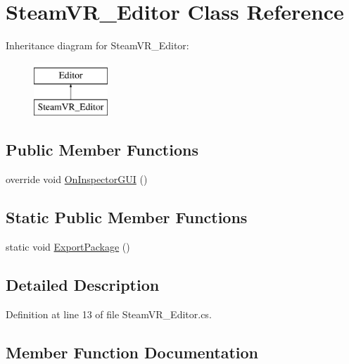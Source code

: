 \hypertarget{class_steam_v_r___editor}{}\section{Steam\+V\+R\+\_\+\+Editor Class Reference}
\label{class_steam_v_r___editor}
Inheritance diagram for Steam\+V\+R\+\_\+\+Editor\+:\begin{figure}[H]
\begin{center}
\leavevmode
\includegraphics[height=2.000000cm]{class_steam_v_r___editor}
\end{center}
\end{figure}
\subsection*{Public Member Functions}
\begin{DoxyCompactItemize}
\item 
override void \mbox{\hyperlink{class_steam_v_r___editor_a3653a66adfbb43e4d72cb43368244be7}{On\+Inspector\+G\+UI}} ()
\end{DoxyCompactItemize}
\subsection*{Static Public Member Functions}
\begin{DoxyCompactItemize}
\item 
static void \mbox{\hyperlink{class_steam_v_r___editor_a9329748a46c5779323758f500a53a866}{Export\+Package}} ()
\end{DoxyCompactItemize}


\subsection{Detailed Description}


Definition at line 13 of file Steam\+V\+R\+\_\+\+Editor.\+cs.



\subsection{Member Function Documentation}
\mbox{\label{class_steam_v_r___editor_a9329748a46c5779323758f500a53a866}} 
